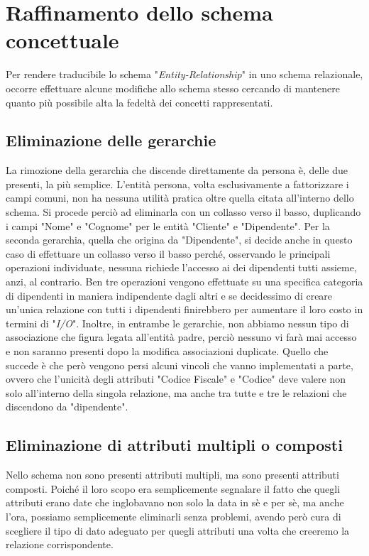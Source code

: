 \documentclass[a4paper, 12pt]{report}
\begin{document}
\newpage

\section{Raffinamento dello schema concettuale}

Per rendere traducibile lo schema "\textit{Entity-Relationship}" in uno schema relazionale, occorre effettuare alcune modifiche allo schema stesso
cercando di mantenere quanto più possibile alta la fedeltà dei concetti rappresentati.

\subsection{Eliminazione delle gerarchie}

La rimozione della gerarchia che discende direttamente da persona è, delle due presenti, la più semplice. L'entità persona, volta esclusivamente a fattorizzare
i campi comuni, non ha nessuna utilità pratica oltre quella citata all'interno dello schema. Si procede perciò ad eliminarla con un collasso verso il basso,
duplicando i campi "Nome" e "Cognome" per le entità "Cliente" e "Dipendente". Per la seconda gerarchia, quella che origina da "Dipendente", si decide anche in questo
caso di effettuare un collasso verso il basso perché, osservando le principali operazioni individuate, nessuna richiede l'accesso ai dei dipendenti tutti assieme,
anzi, al contrario. Ben tre operazioni vengono effettuate su una specifica categoria di dipendenti in maniera indipendente dagli altri e se decidessimo di creare un'unica
relazione con tutti i dipendenti finirebbero per aumentare il loro costo in termini di "\textit{I/O}". Inoltre, in entrambe le gerarchie, non abbiamo nessun tipo di associazione
che figura legata all'entità padre, perciò nessuno vi farà mai accesso e non saranno presenti dopo la modifica associazioni duplicate. Quello che succede è che però
vengono persi alcuni vincoli che vanno implementati a parte, ovvero che l'unicità degli attributi "Codice Fiscale" e "Codice" deve valere non solo all'interno della singola
relazione, ma anche tra tutte e tre le relazioni che discendono da "dipendente".

\subsection{Eliminazione di attributi multipli o composti}

Nello schema non sono presenti attributi multipli, ma sono presenti attributi composti. Poiché il loro scopo era semplicemente segnalare il fatto che quegli attributi erano date
che inglobavano non solo la data in sè e per sè, ma anche l'ora, possiamo semplicemente eliminarli senza problemi, avendo però cura di scegliere il tipo di dato adeguato
per quegli attributi una volta che creeremo la relazione corrispondente.
\end{document}
